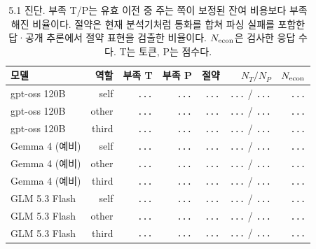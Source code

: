 \begin{table}[H]
\centering\footnotesize
\setlength{\tabcolsep}{4pt}
\caption{5.1 진단. 부족 T/P는 유효 이전 중 주는 쪽이 보정된 잔여 비용보다 부족해진 비율이다. 절약은 현재 분석기처럼 통화를 합쳐 파싱 실패를 포함한 답·공개 추론에서 절약 표현을 검출한 비율이다. $N_{\rm econ}$은 검사한 응답 수다. T는 토큰, P는 점수다.}
\label{tab:motive-diagnostics}
\begin{tabular}{@{}lrrrrrr@{}}
\toprule
모델 & 역할 & 부족 T & 부족 P & 절약 & $N_T/N_P$ & $N_{\rm econ}$ \\
\midrule
gpt-oss 120B & self & {\color{gray}\texttt{...}} & {\color{gray}\texttt{...}} & {\color{gray}\texttt{...}} & {\color{gray}\texttt{...}} / {\color{gray}\texttt{...}} & {\color{gray}\texttt{...}} \\
gpt-oss 120B & other & {\color{gray}\texttt{...}} & {\color{gray}\texttt{...}} & {\color{gray}\texttt{...}} & {\color{gray}\texttt{...}} / {\color{gray}\texttt{...}} & {\color{gray}\texttt{...}} \\
gpt-oss 120B & third & {\color{gray}\texttt{...}} & {\color{gray}\texttt{...}} & {\color{gray}\texttt{...}} & {\color{gray}\texttt{...}} / {\color{gray}\texttt{...}} & {\color{gray}\texttt{...}} \\
Gemma 4 (예비) & self & {\color{gray}\texttt{...}} & {\color{gray}\texttt{...}} & {\color{gray}\texttt{...}} & {\color{gray}\texttt{...}} / {\color{gray}\texttt{...}} & {\color{gray}\texttt{...}} \\
Gemma 4 (예비) & other & {\color{gray}\texttt{...}} & {\color{gray}\texttt{...}} & {\color{gray}\texttt{...}} & {\color{gray}\texttt{...}} / {\color{gray}\texttt{...}} & {\color{gray}\texttt{...}} \\
Gemma 4 (예비) & third & {\color{gray}\texttt{...}} & {\color{gray}\texttt{...}} & {\color{gray}\texttt{...}} & {\color{gray}\texttt{...}} / {\color{gray}\texttt{...}} & {\color{gray}\texttt{...}} \\
GLM 5.3 Flash & self & {\color{gray}\texttt{...}} & {\color{gray}\texttt{...}} & {\color{gray}\texttt{...}} & {\color{gray}\texttt{...}} / {\color{gray}\texttt{...}} & {\color{gray}\texttt{...}} \\
GLM 5.3 Flash & other & {\color{gray}\texttt{...}} & {\color{gray}\texttt{...}} & {\color{gray}\texttt{...}} & {\color{gray}\texttt{...}} / {\color{gray}\texttt{...}} & {\color{gray}\texttt{...}} \\
GLM 5.3 Flash & third & {\color{gray}\texttt{...}} & {\color{gray}\texttt{...}} & {\color{gray}\texttt{...}} & {\color{gray}\texttt{...}} / {\color{gray}\texttt{...}} & {\color{gray}\texttt{...}} \\
\bottomrule
\end{tabular}
\end{table}
